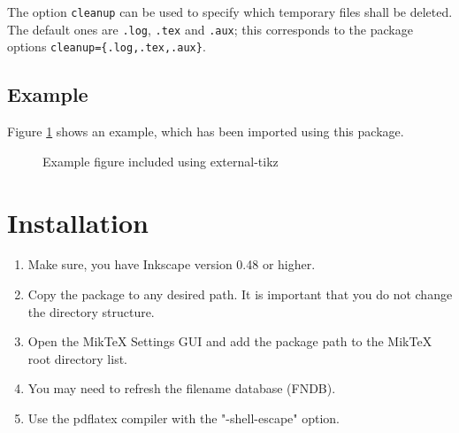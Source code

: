 \documentclass{article}
\begin{document}
The option \texttt{cleanup} can be used to specify which temporary files shall be deleted. The default ones are \texttt{.log}, \texttt{.tex} and \texttt{.aux}; this corresponds to the package options \texttt{cleanup=\{.log,.tex,.aux\}}.

\subsection{Example}
Figure \ref{fig:example:tikz} shows an example, which has been imported using this package.
\begin{figure}[ht]%
	\centering
	\caption{Example figure included using external-tikz}
	\label{fig:example:tikz}
\end{figure}



\section{Installation}
\begin{enumerate}
	\item Make sure, you have Inkscape version 0.48 or higher.
	\item Copy the package to any desired path. It is important that you do not change the directory structure.
	\item Open the MikTeX Settings GUI and add the package path to the MikTeX root directory list.
	\item You may need to refresh the filename database (FNDB).
	\item Use the pdflatex compiler with the "-shell-escape" option.
\end{enumerate}




\end{document}
